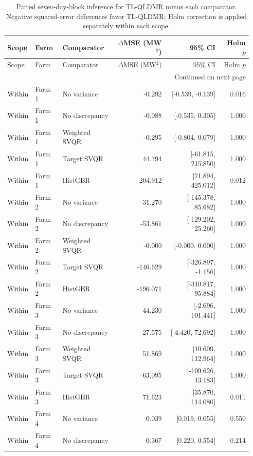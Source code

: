 {\color{blue}\small
\setlength{\tabcolsep}{3.5pt}
\begin{longtable}{lllrrr}
\caption{Paired seven-day-block inference for TL-QLDMR minus each comparator. Negative squared-error differences favor TL-QLDMR; Holm correction is applied separately within each scope.}\label{tab:selection-v2-full-inference}\\
\toprule
Scope & Farm & Comparator & $\Delta$MSE (MW$^2$) & 95\% CI & Holm $p$ \\
\midrule
\endfirsthead
\toprule
Scope & Farm & Comparator & $\Delta$MSE (MW$^2$) & 95\% CI & Holm $p$ \\
\midrule
\endhead
\midrule
\multicolumn{6}{r}{Continued on next page} \\
\endfoot
\bottomrule
\endlastfoot
Within & Farm 1 & No variance & -0.292 & [-0.539, -0.139] & 0.016 \\
Within & Farm 1 & No discrepancy & -0.088 & [-0.535, 0.305] & 1.000 \\
Within & Farm 1 & Weighted SVQR & -0.295 & [-0.804, 0.079] & 1.000 \\
Within & Farm 1 & Target SVQR & 44.794 & [-61.815, 215.850] & 1.000 \\
Within & Farm 1 & HistGBR & 204.912 & [71.894, 425.012] & 0.012 \\
Within & Farm 2 & No variance & -31.270 & [-145.378, 85.682] & 1.000 \\
Within & Farm 2 & No discrepancy & -53.861 & [-129.202, 25.260] & 1.000 \\
Within & Farm 2 & Weighted SVQR & -0.000 & [-0.000, 0.000] & 1.000 \\
Within & Farm 2 & Target SVQR & -146.629 & [-326.897, -1.156] & 1.000 \\
Within & Farm 2 & HistGBR & -196.071 & [-310.817, 95.884] & 1.000 \\
Within & Farm 3 & No variance & 44.230 & [-2.696, 101.441] & 1.000 \\
Within & Farm 3 & No discrepancy & 27.575 & [-4.420, 72.692] & 1.000 \\
Within & Farm 3 & Weighted SVQR & 51.869 & [10.609, 112.964] & 1.000 \\
Within & Farm 3 & Target SVQR & -63.095 & [-109.626, 13.183] & 1.000 \\
Within & Farm 3 & HistGBR & 71.623 & [35.870, 114.080] & 0.011 \\
Within & Farm 4 & No variance & 0.039 & [0.019, 0.055] & 0.550 \\
Within & Farm 4 & No discrepancy & 0.367 & [0.220, 0.554] & 0.214 \\

\end{longtable}}

